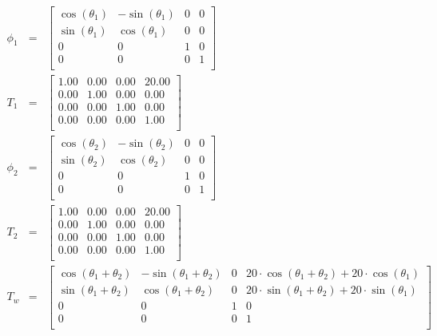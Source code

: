 \begin{eqnarray}
\phi_1&=&\begin{bmatrix}
\cos(\theta_1)&-\sin(\theta_1)&0&0\\ 
\sin(\theta_1)&\cos(\theta_1)&0&0\\ 
0&0&1&0\\ 
0&0&0&1\\ 
\end{bmatrix} \\
T_1&=&\begin{bmatrix}
1.00&0.00&0.00&20.00\\ 
0.00&1.00&0.00&0.00\\ 
0.00&0.00&1.00&0.00\\ 
0.00&0.00&0.00&1.00\\ 
\end{bmatrix} \\
\phi_2&=&\begin{bmatrix}
\cos(\theta_2)&-\sin(\theta_2)&0&0\\ 
\sin(\theta_2)&\cos(\theta_2)&0&0\\ 
0&0&1&0\\ 
0&0&0&1\\ 
\end{bmatrix} \\
T_2&=&\begin{bmatrix}
1.00&0.00&0.00&20.00\\ 
0.00&1.00&0.00&0.00\\ 
0.00&0.00&1.00&0.00\\ 
0.00&0.00&0.00&1.00\\ 
\end{bmatrix} \\
T_w&=&\begin{bmatrix}
\cos(\theta_1 + \theta_2)&-\sin(\theta_1 + \theta_2)&0&20\cdot \cos(\theta_1 + \theta_2) + 20\cdot \cos(\theta_1)\\ 
\sin(\theta_1 + \theta_2)&\cos(\theta_1 + \theta_2)&0&20\cdot \sin(\theta_1 + \theta_2) + 20\cdot \sin(\theta_1)\\ 
0&0&1&0\\ 
0&0&0&1\\ 
\end{bmatrix} 
\end{eqnarray}
